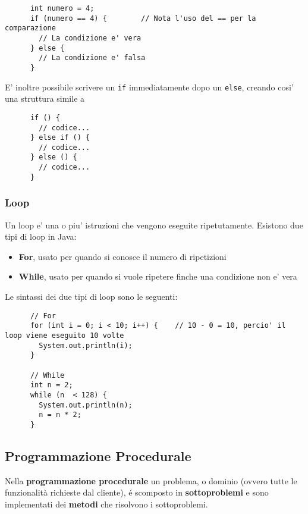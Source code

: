 \documentclass{article}
\begin{document}
{    \begin{verbatim}
      int numero = 4;
      if (numero == 4) {        // Nota l'uso del == per la comparazione
        // La condizione e' vera
      } else {
        // La condizione e' falsa
      }
    \end{verbatim}

    E' inoltre possibile scrivere un \texttt{if} immediatamente dopo un \texttt{else}, creando cosi' una struttura simile a

    \begin{verbatim}
      if () {
        // codice...
      } else if () {
        // codice...
      } else () {
        // codice...
      }
    \end{verbatim}

    \subsubsection{Loop}
    Un loop e' una o piu' istruzioni che vengono eseguite ripetutamente. Esistono due tipi di loop in Java:
    
    \begin{itemize}
      \item \textbf{For}, usato per quando si conosce il numero di ripetizioni
      \item \textbf{While}, usato per quando si vuole ripetere finche una condizione non e' vera
    \end{itemize}

    Le sintassi dei due tipi di loop sono le seguenti:

    \begin{verbatim}
      // For
      for (int i = 0; i < 10; i++) {    // 10 - 0 = 10, percio' il loop viene eseguito 10 volte
        System.out.println(i);
      }

      // While
      int n = 2;
      while (n  < 128) {
        System.out.println(n);
        n = n * 2;
      }
    \end{verbatim}

    \subsection{Programmazione Procedurale}
    Nella \textbf{programmazione procedurale} un problema, o dominio \small{(ovvero tutte le funzionalità richieste dal cliente)}, é scomposto in \textbf{sottoproblemi} e sono implementati dei \textbf{metodi} che risolvono i sottoproblemi.

}
\end{document}
